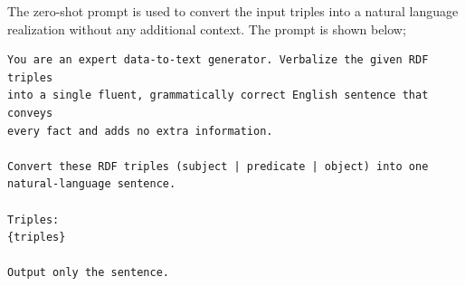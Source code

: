 The zero-shot prompt is used to convert the input triples into a natural language realization without any additional context. 
The prompt is shown below;

\begin{lstlisting}
You are an expert data-to-text generator. Verbalize the given RDF triples 
into a single fluent, grammatically correct English sentence that conveys 
every fact and adds no extra information.

Convert these RDF triples (subject | predicate | object) into one
natural-language sentence.

Triples:
{triples}

Output only the sentence.
\end{lstlisting}
